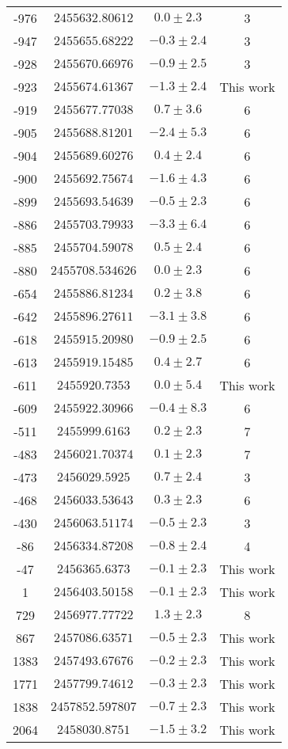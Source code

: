 \begin{longtable}{cccc}
-976 & $2455632.80612$ & $0.0\pm2.3$ & 3 \\
-947 & $2455655.68222$ & $-0.3\pm2.4$ & 3 \\
-928 & $2455670.66976$ & $-0.9\pm2.5$ & 3 \\
-923 & $2455674.61367$ & $-1.3\pm2.4$ & This work \\
-919 & $2455677.77038$ & $0.7\pm3.6$ & 6  \\
-905 & $2455688.81201$ & $-2.4\pm5.3$ & 6 \\
-904 & $2455689.60276$ & $0.4\pm2.4$ & 6 \\
-900 & $2455692.75674$ & $-1.6\pm4.3$ & 6 \\
-899 & $2455693.54639$ & $-0.5\pm2.3$ & 6  \\
-886 & $2455703.79933$ & $-3.3\pm6.4$ & 6 \\
-885 & $2455704.59078$ & $0.5\pm2.4$ & 6 \\
-880 & $2455708.534626$ & $0.0\pm 2.3$ & 6  \\
-654 & $2455886.81234$ &  $0.2\pm3.8$ & 6 \\
-642 & $2455896.27611$ & $-3.1\pm3.8$ & 6 \\
-618 & $2455915.20980$ & $-0.9\pm2.5$ & 6  \\
-613 & $2455919.15485$ & $0.4\pm 2.7$ & 6\\
-611 & $2455920.7353$ & $0.0\pm5.4$ & This work \\
-609 & $2455922.30966$ & $-0.4\pm8.3$ & 6 \\
-511 & $2455999.6163$ & $0.2\pm2.3$ & 7 \\
-483 & $2456021.70374$ & $0.1\pm2.3$ & 7 \\
-473 & $2456029.5925$ & $0.7\pm 2.4$ &3 \\
-468 & $2456033.53643$ &  $0.3\pm 2.3$ & 6  \\
-430 & $2456063.51174$ & $-0.5\pm 2.3$ & 3 \\
-86 & $2456334.87208$ & $-0.8\pm2.4$ & 4 \\
-47 & $2456365.6373$  & $-0.1\pm2.3$& This work \\
1 & $2456403.50158$ &  $-0.1\pm2.3$ & This work \\
729 & $2456977.77722$  & $1.3\pm2.3$ & 8 \\
867 & $2457086.63571$ & $-0.5\pm2.3$& This work \\
1383 & $2457493.67676$   & $-0.2\pm2.3$& This work  \\
1771 & $2457799.74612$ &  $-0.3\pm2.3$ & This work \\
1838 & $2457852.597807$ & $-0.7\pm2.3$ & This work\\ 
2064 & $2458030.8751$  & $-1.5\pm3.2$& This work \\
\hline
\end{longtable} 

